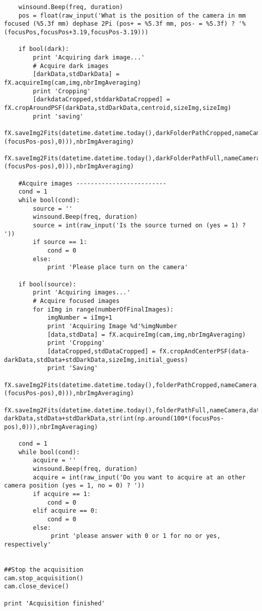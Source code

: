 \begin{lstlisting}
    winsound.Beep(freq, duration)
    pos = float(raw_input('What is the position of the camera in mm focused (%5.3f mm) dephase 2Pi (pos+ = %5.3f mm, pos- = %5.3f) ? '%(focusPos,focusPos+3.19,focusPos-3.19)))

    if bool(dark):
        print 'Acquiring dark image...'
        # Acquire dark images
        [darkData,stdDarkData] = fX.acquireImg(cam,img,nbrImgAveraging)
        print 'Cropping'
        [darkdataCropped,stddarkDataCropped] = fX.cropAroundPSF(darkData,stdDarkData,centroid,sizeImg,sizeImg)
        print 'saving'        
        fX.saveImg2Fits(datetime.datetime.today(),darkFolderPathCropped,nameCamera,darkdataCropped,stddarkDataCropped,str(int(np.around(100*(focusPos-pos),0))),nbrImgAveraging)
        fX.saveImg2Fits(datetime.datetime.today(),darkFolderPathFull,nameCamera,darkData,stdDarkData,str(int(np.around(100*(focusPos-pos),0))),nbrImgAveraging)

    #Acquire images -------------------------
    cond = 1
    while bool(cond):
        source = ''
        winsound.Beep(freq, duration)
        source = int(raw_input('Is the source turned on (yes = 1) ? '))
        if source == 1:
            cond = 0
        else:
            print 'Please place turn on the camera'

    if bool(source):
        print 'Acquiring images...'
        # Acquire focused images
        for iImg in range(numberOfFinalImages):
            imgNumber = iImg+1
            print 'Acquiring Image %d'%imgNumber
            [data,stdData] = fX.acquireImg(cam,img,nbrImgAveraging)
            print 'Cropping'
            [dataCropped,stdDataCropped] = fX.cropAndCenterPSF(data-darkData,stdData+stdDarkData,sizeImg,initial_guess)
            print 'Saving'
            fX.saveImg2Fits(datetime.datetime.today(),folderPathCropped,nameCamera,dataCropped,stdDataCropped,str(int(np.around(100*(focusPos-pos),0))),nbrImgAveraging)
            fX.saveImg2Fits(datetime.datetime.today(),folderPathFull,nameCamera,data-darkData,stdData+stdDarkData,str(int(np.around(100*(focusPos-pos),0))),nbrImgAveraging)

    cond = 1
    while bool(cond):
        acquire = ''
        winsound.Beep(freq, duration)
        acquire = int(raw_input('Do you want to acquire at an other camera position (yes = 1, no = 0) ? '))
        if acquire == 1:
            cond = 0
        elif acquire == 0:
            cond = 0
        else:
             print 'please answer with 0 or 1 for no or yes, respectively'


##Stop the acquisition
cam.stop_acquisition()
cam.close_device()

print 'Acquisition finished'

\end{lstlisting}

